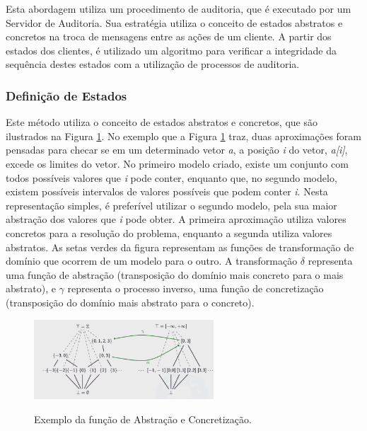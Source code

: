 Esta abordagem utiliza um procedimento de auditoria, que é executado por um Servidor de Auditoria. Sua estratégia utiliza o conceito de estados abstratos e concretos na troca de mensagens entre as ações de um cliente. A partir dos estados dos clientes, é utilizado um algoritmo para verificar a integridade da sequência destes estados com a utilização de processos de auditoria.

\subsubsection {Definição de Estados}
\label{cap:definicaoestado}

Este método utiliza o conceito de estados abstratos e concretos, que são ilustrados na Figura \ref{fig:abstracao}. No exemplo que a Figura \ref{fig:abstracao} traz, duas aproximações foram pensadas para checar se em um determinado vetor \textit{a}, a posição \textit{i} do vetor, \textit{a[i]}, excede os limites do vetor. No primeiro modelo criado, existe um conjunto com todos possíveis valores que \textit{i} pode conter, enquanto que, no segundo modelo, existem possíveis intervalos de valores possíveis que podem conter \textit{i}. Nesta representação simples, é preferível utilizar o segundo modelo, pela sua maior abstração dos valores que \textit{i} pode obter. A primeira aproximação utiliza valores concretos para a resolução do problema, enquanto a segunda utiliza valores abstratos. As setas verdes da figura representam as funções de transformação de domínio que ocorrem de um modelo para o outro.  A transformação $\delta$ representa uma função de abstração (transposição do domínio mais concreto para o mais abstrato), e $\gamma$ representa o processo inverso, uma função de concretização (transposição do domínio mais abstrato para o concreto).

\begin{figure}[h!]
	\begin{center}
		\includegraphics[width=0.6\textwidth]{imagens/abstracao.png}
		\caption[Exemplo da função de Abstração e Concretização]{Exemplo da função de Abstração e Concretização.}
		\label{fig:abstracao}
	\end{center}
\end{figure}

